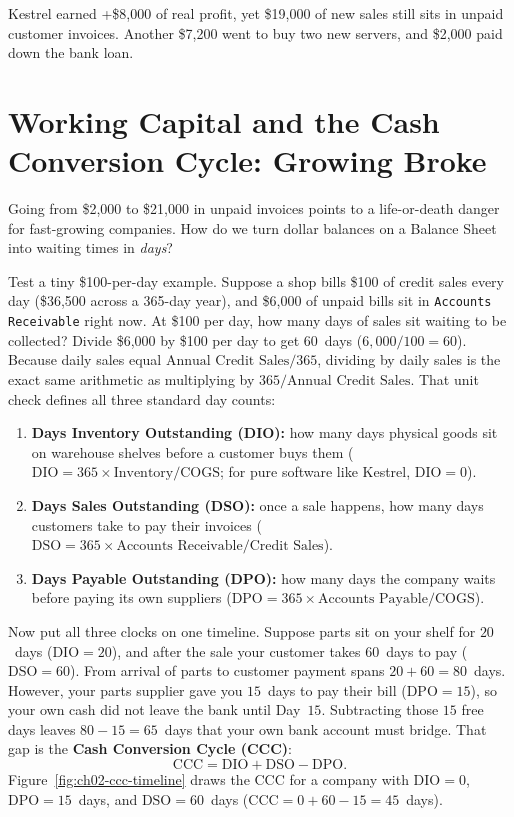 Kestrel earned +\$8,000 of real profit, yet \$19,000 of new sales still sits in unpaid customer invoices. Another \$7,200 went to buy two new servers, and \$2,000 paid down the bank loan.

\section{Working Capital and the Cash Conversion Cycle: Growing Broke}

Going from \$2,000 to \$21,000 in unpaid invoices points to a life-or-death danger for fast-growing companies. How do we turn dollar balances on a Balance Sheet into waiting times in \emph{days}?

Test a tiny \$100-per-day example. Suppose a shop bills \$100 of credit sales every day (\$36,500 across a 365-day year), and \$6,000 of unpaid bills sit in \texttt{Accounts Receivable} right now. At \$100 per day, how many days of sales sit waiting to be collected? Divide \$6,000 by \$100 per day to get $60$~days ($6{,}000 / 100 = 60$). Because daily sales equal $\text{Annual Credit Sales} / 365$, dividing by daily sales is the exact same arithmetic as multiplying by $365 / \text{Annual Credit Sales}$. That unit check defines all three standard day counts:

\begin{enumerate}
  \item \textbf{Days Inventory Outstanding (DIO):} how many days physical goods sit on warehouse shelves before a customer buys them ($\text{DIO} = 365 \times \text{Inventory} / \text{COGS}$; for pure software like Kestrel, $\text{DIO} = 0$).
  \item \textbf{Days Sales Outstanding (DSO):} once a sale happens, how many days customers take to pay their invoices ($\text{DSO} = 365 \times \text{Accounts Receivable} / \text{Credit Sales}$).
  \item \textbf{Days Payable Outstanding (DPO):} how many days the company waits before paying its own suppliers ($\text{DPO} = 365 \times \text{Accounts Payable} / \text{COGS}$).
\end{enumerate}

Now put all three clocks on one timeline. Suppose parts sit on your shelf for $20$~days ($\text{DIO} = 20$), and after the sale your customer takes $60$~days to pay ($\text{DSO} = 60$). From arrival of parts to customer payment spans $20 + 60 = 80$~days. However, your parts supplier gave you $15$~days to pay their bill ($\text{DPO} = 15$), so your own cash did not leave the bank until Day~$15$. Subtracting those $15$ free days leaves $80 - 15 = 65$~days that your own bank account must bridge. That gap is the \textbf{Cash Conversion Cycle (CCC)}:
\begin{equation}
  \label{eq:ccc}
  \text{CCC} = \text{DIO} + \text{DSO} - \text{DPO}.
\end{equation}
Figure~\ref{fig:ch02-ccc-timeline} draws the $\text{CCC}$ for a company with $\text{DIO} = 0$, $\text{DPO} = 15$~days, and $\text{DSO} = 60$~days ($\text{CCC} = 0 + 60 - 15 = 45$~days).

